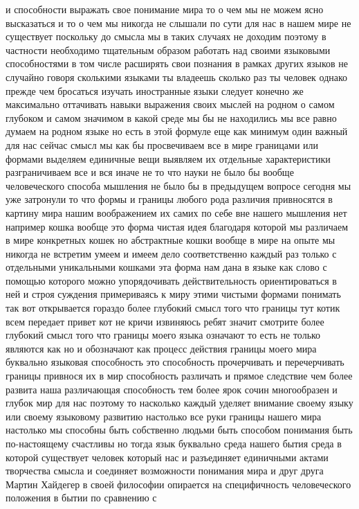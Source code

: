 и способности выражать свое понимание мира то о чем мы не можем ясно высказаться
и то о чем мы никогда не слышали по сути для нас в нашем мире не существует
поскольку до смысла мы в таких случаях не доходим поэтому в частности необходимо
тщательным образом работать над своими языковыми способностями в том числе
расширять свои познания в рамках других языков не случайно говоря сколькими
языками ты владеешь сколько раз ты человек однако прежде чем бросаться изучать
иностранные языки следует конечно же максимально оттачивать навыки выражения
своих мыслей на родном о самом глубоком и самом значимом в какой среде мы бы не
находились мы все равно думаем на родном языке но есть в этой формуле еще как
минимум один важный для нас сейчас смысл мы как бы просвечиваем все в мире
границами или формами выделяем единичные вещи выявляем их отдельные
характеристики разграничиваем все и вся иначе не то что науки не было бы вообще
человеческого способа мышления не было бы в предыдущем вопросе сегодня мы уже
затронули то что формы и границы любого рода различия привносятся в картину мира
нашим воображением их самих по себе вне нашего мышления нет например кошка
вообще это форма чистая идея благодаря которой мы различаем в мире конкретных
кошек но абстрактные кошки вообще в мире на опыте мы никогда не встретим умеем и
имеем дело соответственно каждый раз только с отдельными уникальными кошками эта
форма нам дана в языке как слово с помощью которого можно упорядочивать
действительность ориентироваться в ней и строя суждения примериваясь к миру
этими чистыми формами понимать так вот открывается гораздо более глубокий смысл
того что границы тут котик всем передает привет кот не кричи извиняюсь ребят
значит смотрите более глубокий смысл того что границы моего языка означают то
есть не только являются как но и обозначают как процесс действия границы моего
мира буквально языковая способность это способность прочерчивать и перечерчивать
границы привнося их в мир способность различать и прямое следствие чем более
развита наша различающая способность тем более ярок сочин многообразен и глубок
мир для нас поэтому то насколько каждый уделяет внимание своему языку или своему
языковому развитию настолько все руки границы нашего мира настолько мы способны
быть собственно людьми быть способом понимания быть по-настоящему счастливы но
тогда язык буквально среда нашего бытия среда в которой существует человек
который нас и разъединяет единичными актами творчества смысла и соединяет
возможности понимания мира и друг друга Мартин Хайдегер в своей философии
опирается на специфичность человеческого положения в бытии по сравнению с
